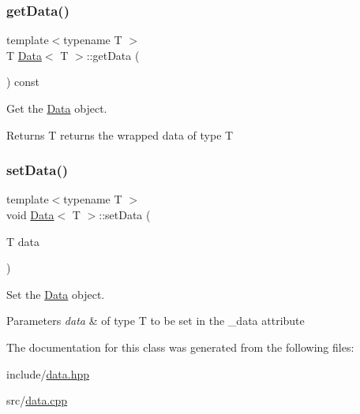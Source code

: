 \subsubsection{\texorpdfstring{get\+Data()}{getData()}}
{\footnotesize\ttfamily template$<$typename T $>$ \\
T \hyperlink{classData}{Data}$<$ T $>$\+::get\+Data (\begin{DoxyParamCaption}{ }\end{DoxyParamCaption}) const\hspace{0.3cm}{\ttfamily [virtual]}}



Get the \hyperlink{classData}{Data} object. 

\begin{DoxyReturn}{Returns}
T returns the wrapped data of type T 
\end{DoxyReturn}
\mbox{\label{classData_a08197cc91bb861231a63f409e6b60f44}} 
\subsubsection{\texorpdfstring{set\+Data()}{setData()}}
{\footnotesize\ttfamily template$<$typename T $>$ \\
void \hyperlink{classData}{Data}$<$ T $>$\+::set\+Data (\begin{DoxyParamCaption}\item[{T}]{data }\end{DoxyParamCaption})\hspace{0.3cm}{\ttfamily [virtual]}}



Set the \hyperlink{classData}{Data} object. 


\begin{DoxyParams}{Parameters}
{\em data} & of type T to be set in the \+\_\+data attribute \\
\hline
\end{DoxyParams}


The documentation for this class was generated from the following files\+:\begin{DoxyCompactItemize}
\item 
include/\hyperlink{data_8hpp}{data.\+hpp}\item 
src/\hyperlink{data_8cpp}{data.\+cpp}\end{DoxyCompactItemize}
